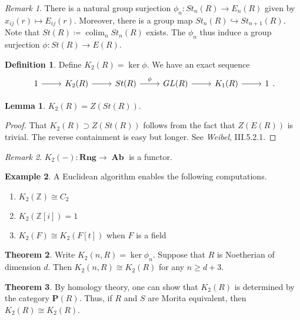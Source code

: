 \documentclass[10pt,letterpaper,cm]{nupset}
\theoremstyle{definition}
\newtheorem{definition}{Definition}
\newtheorem{exmp}[definition]{Example}
\theoremstyle{theorem}
\newtheorem{theorem}{Theorem}
\newtheorem{lemma}[theorem]{Lemma}
\theoremstyle{remark}
\newtheorem{remark}{Remark}
\renewcommand{\P}{\mathbf P}
\newcommand{\Z}{\mathbb Z}
\newcommand{\1}{\mathbf{1}}
\newcommand{\0}{\vec 0}
\DeclareMathOperator{\colim}{colim}
\DeclareMathOperator{\Ab}{\mathbf{Ab}}
\begin{document}
\begin{remark}
There is a natural group surjection $\phi_n : St_n(R) \to E_n(R)$ given by $x_{ij}(r) \mapsto E_{ij}(r)$. Moreover, there is a group map $St_n(R) \hookrightarrow St_{n+1}(R)$. Note that $St(R)\coloneqq \colim_n St_n(R)$ exists. The $\phi_n$ thus induce a group surjection $\phi : St(R) \to E(R)$.
\end{remark}

\begin{definition}
Define $K_2(R)  = \ker \phi$. We have an exact sequence
\[
\begin{tikzcd}
1 \arrow[r] & K_2(R) \arrow[r] & St(R) \arrow[r, "\phi"] & GL(R) \arrow[r] & K_1(R) \arrow[r] & 1
\end{tikzcd}.
\]
\end{definition}

\begin{lemma}
$K_2(R) = Z(St(R))$.
\end{lemma}
\begin{proof}
That $K_2(R) \supset Z(St(R))$ follows from the fact that $Z(E(R))$ is trivial. The reverse containment is easy but longer. See \textit{Weibel}, III.5.2.1.
\end{proof}

\begin{remark}
$K_2(-) : \mathbf{Rng} \to \Ab$ is a functor.
\end{remark}

\begin{exmp} A Euclidean algorithm enables the following computations.
\begin{enumerate}
\item $K_2(\Z) \cong C_2$
\item $K_2(\Z[i]) =1$
\item $K_2(F) \cong K_2(F[t])$ when $F$ is a field
\end{enumerate}
\end{exmp}

\begin{theorem}
Write $K_2(n, R) = \ker \phi_n$. Suppose that $R$ is Noetherian of dimension $d$. Then $K_2(n, R) \cong K_2(R)$ for any $n\geq d +3$.
\end{theorem}

\begin{theorem}
By homology theory, one can show that $K_2(R)$ is determined by the category $\P(R)$. Thus, if $R$ and $S$ are Morita equivalent, then $K_2(R) \cong K_2(R)$.
\end{theorem}
\end{document}
